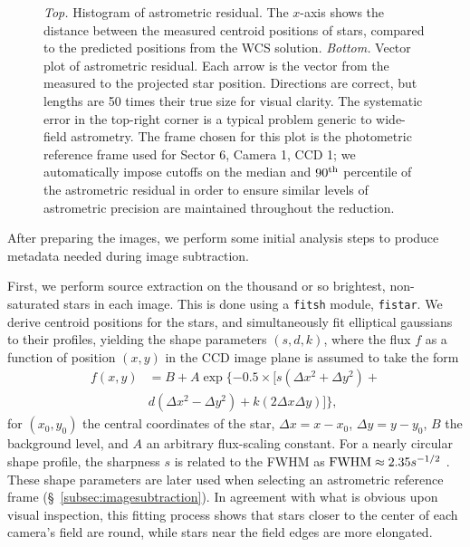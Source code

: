 \documentclass[12pt,twocolumn,tighten,trackchanges]{aastex62}
\begin{document}
\begin{figure}[!t]
	\vspace{-0.8cm}
	\vspace{-0.8cm}
    \caption{
		{\it Top.} Histogram of astrometric residual. The $x$-axis shows 
		the distance between the measured centroid positions of stars, 
		compared to the predicted positions from the WCS solution.
    {\it Bottom.} Vector plot of astrometric residual. Each arrow is
    the vector from the measured to the projected star position.
    Directions are correct, but lengths are 50 times their true size
    for visual clarity.  The systematic error in the top-right
    corner is a typical problem generic to wide-field astrometry.  The
    frame chosen for this plot is the photometric reference frame used
    for Sector 6, Camera 1, CCD 1; we automatically impose cutoffs on
    the median and $90^{\rm th}$ percentile of the astrometric
    residual in order to ensure similar levels of astrometric
    precision are maintained throughout the reduction.
	}
	\label{fig:astromresid}
\end{figure}

After preparing the images, we perform some initial analysis steps to
produce metadata needed during image subtraction.  

First, we perform source extraction on the thousand or so brightest,
non-saturated stars in each image.  This is done using a
\texttt{fitsh} module, \texttt{fistar}.  We derive centroid positions
for the stars, and simultaneously fit elliptical gaussians to their
profiles, yielding the shape parameters $(s,d,k)$, where the flux $f$
as a function of position $(x,y)$ in the CCD image plane is assumed to
take the form
\begin{align}
  f(x,y) &= B + A \exp \{ -0.5 \times [
    s(\Delta x^2 + \Delta y^2) + \\
    \nonumber
    &d(\Delta x^2 - \Delta y^2) +
    k(2\Delta x \Delta y)
  ]  \},
\end{align}
for $(x_0,y_0)$ the central coordinates of the star, $\Delta x =
x-x_0$, $\Delta y = y - y_0$, $B$ the background level, and $A$ an
arbitrary flux-scaling constant.  For a nearly circular shape profile,
the sharpness $s$ is related to the FWHM as ${\rm FWHM} \approx
2.35s^{-1/2}$ \citep[{\it e.g.},][]{Pal_2009}.  These shape parameters
are later used when selecting an astrometric reference frame
(\S~\ref{subsec:imagesubtraction}).  In agreement with what is obvious
upon visual inspection, this fitting process shows that stars closer
to the center of each camera's field are round, while stars near the
field edges are more elongated.
\end{document}

